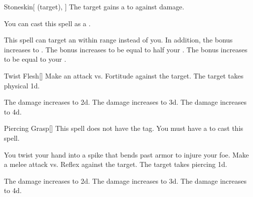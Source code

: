 \lowercase{\hypertarget{spell:Stoneskin}{}}\label{spell:Stoneskin}
\begin{attuneability}[Rank 1]{\hypertarget{spell:Stoneskin}{Stoneskin}}[ (target), ]
The target gains a   to  against  damage.

You can cast this spell as a .

\rankline
{} This spell can target an  within \rngmed range instead of you.
In addition, the bonus increases to .
 The bonus increases to be equal to half your .
 The bonus increases to be equal to your .

\end{attuneability}
\vspace{0.25em}



\lowercase{\hypertarget{spell:Twist Flesh}{}}\label{spell:Twist Flesh}
\begin{freeability}[Rank 1]{\hypertarget{spell:Twist Flesh}{Twist Flesh}}[]
Make an attack vs. Fortitude against the target.
\hit The target takes physical  \plus1d.

\rankline
{} The damage increases to  \plus2d.
 The damage increases to  \plus3d.
 The damage increases to  \plus4d.

\end{freeability}
\vspace{0.25em}



\lowercase{\hypertarget{spell:Piercing Grasp}{}}\label{spell:Piercing Grasp}
\begin{freeability}[Rank 2]{\hypertarget{spell:Piercing Grasp}{Piercing Grasp}}[]
This spell does not have the  tag.
You must have a  to cast this spell.

You twist your hand into a spike that bends past armor to injure your foe.
Make a melee attack vs. Reflex against the target.
\hit The target takes piercing  \plus1d.

\rankline
{} The damage increases to  \plus2d.
 The damage increases to  \plus3d.
 The damage increases to  \plus4d.

\end{freeability}
\vspace{0.25em}



